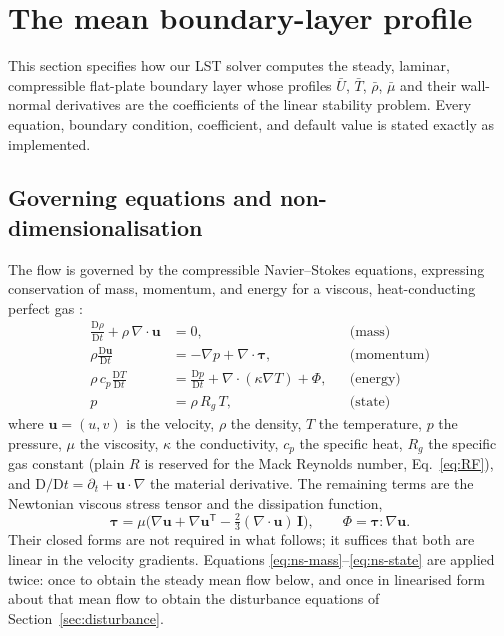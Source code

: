 \documentclass[11pt]{article}
\providecommand{\Dmat}{\mathrm{D}}
\begin{document}
\clearpage
\section{The mean boundary-layer profile}\label{sec:mean}
This section specifies how our LST solver computes the steady, laminar, compressible
flat-plate boundary layer whose profiles $\bar U$, $\bar T$, $\bar\rho$, $\bar\mu$ and their
wall-normal derivatives are the coefficients of the linear stability problem. Every equation,
boundary condition, coefficient, and default value is stated exactly as implemented.

\subsection{Governing equations and non-dimensionalisation}\label{sec:gov}
The flow is governed by the compressible Navier--Stokes equations, expressing conservation of mass,
momentum, and energy for a viscous, heat-conducting perfect gas \cite{white2006}:
\begin{align}
  \frac{\Dmat\rho}{\Dmat t}+\rho\,\nabla\!\cdot\!\mathbf u &= 0, &&\text{(mass)}\label{eq:ns-mass}\\
  \rho\frac{\Dmat\mathbf u}{\Dmat t} &= -\nabla p+\nabla\!\cdot\!\boldsymbol\tau, &&\text{(momentum)}\label{eq:ns-mom}\\
  \rho\,c_p\frac{\Dmat T}{\Dmat t} &= \frac{\Dmat p}{\Dmat t}+\nabla\!\cdot(\kappa\nabla T)+\Phi, &&\text{(energy)}\label{eq:ns-energy}\\
  p &= \rho\,R_g\,T, &&\text{(state)}\label{eq:ns-state}
\end{align}
where $\mathbf u=(u,v)$ is the velocity, $\rho$ the density, $T$ the temperature, $p$ the pressure, $\mu$
the viscosity, $\kappa$ the conductivity, $c_p$ the specific heat, $R_g$ the specific gas constant (plain
$R$ is reserved for the Mack Reynolds number, Eq.~\eqref{eq:RF}), and
$\Dmat/\Dmat t=\partial_t+\mathbf u\!\cdot\!\nabla$ the material derivative. The remaining terms are the
Newtonian viscous stress tensor and the dissipation function,
\begin{equation}\label{eq:tauphi}
  \boldsymbol\tau=\mu\Big(\nabla\mathbf u+\nabla\mathbf u^{\mathsf T}-\tfrac23(\nabla\!\cdot\!\mathbf u)\,\mathbf I\Big),
  \qquad \Phi=\boldsymbol\tau\!:\!\nabla\mathbf u .
\end{equation}
Their closed forms are not required in what follows; it suffices that both are linear in the velocity
gradients. Equations \eqref{eq:ns-mass}--\eqref{eq:ns-state} are applied twice: once to obtain the steady
mean flow below, and once in linearised form about that mean flow to obtain the disturbance
equations of Section~\ref{sec:disturbance}.
\end{document}
